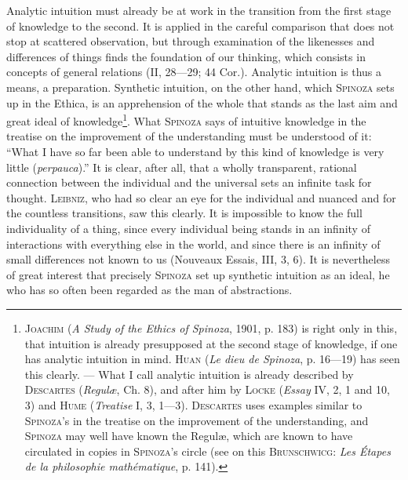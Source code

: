 \documentclass[12pt]{article}
\newcommand{\opage}[1]{\marginnote{\footnotesize\textit{[#1]}}}
\begin{document}
Analytic intuition must already be at work in the transition from the first stage of knowledge
to the second. It is applied in the careful comparison that does not stop at scattered
observation, but through examination of the likenesses and differences of things finds the
foundation of our thinking, which \opage{53}consists in concepts of general relations (II,
28---29; 44 Cor.). Analytic intuition is thus a means, a preparation. Synthetic intuition, on
the other hand, which \textsc{Spinoza} sets up in the Ethica, is an apprehension of the whole
that stands as the last aim and great ideal of knowledge\footnote{\textsc{Joachim} (\textit{A
Study of the Ethics of Spinoza}, 1901, p. 183) is right only in this, that intuition is
already presupposed at the second stage of knowledge, if one has analytic intuition in mind.
\textsc{Huan} (\textit{Le dieu de Spinoza}, p. 16---19) has seen this clearly. --- What I
call analytic intuition is already described by \textsc{Descartes} (\textit{Regulæ}, Ch. 8),
and after him by \textsc{Locke} (\textit{Essay} IV, 2, 1 and 10, 3) and \textsc{Hume}
(\textit{Treatise} I, 3, 1---3). \textsc{Descartes} uses examples similar to
\textsc{Spinoza}'s in the treatise on the improvement of the understanding, and
\textsc{Spinoza} may well have known the Regulæ, which are known to have circulated in copies
in \textsc{Spinoza}'s circle (see on this \textsc{Brunschwicg}: \textit{Les Étapes de la
philosophie mathématique}, p. 141).}. What \textsc{Spinoza} says of intuitive knowledge in
the treatise on the improvement of the understanding must be understood of it: ``What I have
so far been able to understand by this kind of knowledge is very little (\textit{perpauca}).''
It is clear, after all, that a wholly transparent, rational connection between the individual
and the universal sets an infinite task for thought. \textsc{Leibniz}, who had so clear an
eye for the individual and nuanced and for the countless transitions, saw this clearly. It is
impossible to know the full individuality of a thing, since every individual being stands in
an infinity of interactions with everything else in the world, and since there is an infinity
of small differences not known to us (Nouveaux Essais, III, 3, 6). It is nevertheless of great
interest that precisely \textsc{Spinoza} set up synthetic intuition as an ideal, he who has so
often been regarded as the man of abstractions.
\end{document}
